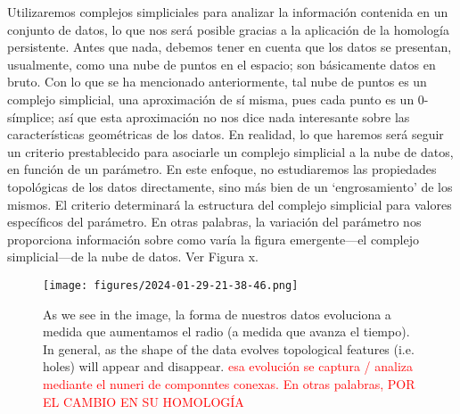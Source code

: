 \documentclass[a4paper,11pt]{article}
\newcommand{\red}[1]{\textcolor{red}{#1}}
\begin{document}
Utilizaremos complejos  simpliciales para analizar la información contenida en un conjunto de datos, lo que nos será posible gracias a la aplicación de la homología persistente. 
Antes que nada, debemos tener  en cuenta que  los datos se presentan, usualmente, como una nube de puntos en el espacio; son básicamente datos en bruto.
Con lo que se ha mencionado anteriormente, tal nube de puntos  es un complejo simplicial, una aproximación de sí misma, pues cada punto es un \(0\)-símplice; así que esta aproximación no nos dice nada interesante sobre las características geométricas de los datos.
En realidad, lo que haremos será seguir un criterio prestablecido para  asociarle un complejo simplicial a la nube de datos, en función de un parámetro.
En este enfoque, no estudiaremos las propiedades topológicas de los datos directamente, sino más bien de un `engrosamiento' de los mismos. El criterio determinará la estructura del complejo simplicial para  valores específicos del parámetro. 
En otras palabras, la variación del parámetro nos proporciona información sobre como varía la figura emergente---el complejo simplicial---de la nube de datos. Ver Figura x. 

\begin{figure}[!htb]
    \centering
    \texttt{[image: figures/2024-01-29-21-38-46.png]}
    \caption{As we see in the image, la forma de nuestros datos evoluciona a medida que aumentamos el radio (a medida que avanza el tiempo). In general, as the shape of the data evolves topological features (i.e. holes) will appear and disappear. \red{
        esa evolución se  captura / analiza mediante el nuneri de componntes conexas. En otras palabras, POR EL CAMBIO EN SU HOMOLOGÍA}}%
\end{figure}
\end{document}
